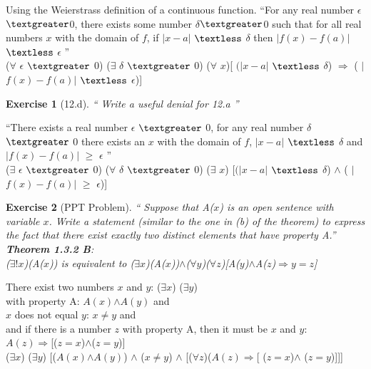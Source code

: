 \documentclass[11pt]{article}
\theoremstyle{quest}
\newtheorem*{exercise}{Exercise}
\begin{document}
\noindent Using the Weierstrass definition of a continuous function. ``For any real number 
$\epsilon$$\textgreater$0, there exists some number $\delta$$\textgreater$0 such that for all real numbers 
$x$ with the domain of $f$, if $|$$x-a$$|$ $\textless$ $\delta$ then $|$$f(x)-f(a)$$|$ $\textless$ $\epsilon$ ''\\

($\forall$ $\epsilon$ $\textgreater$ 0) ($\exists$ $\delta$ $\textgreater$ 0) ($\forall$ $x$)[ $(|$$x-a$$|$ $\textless$ $\delta$) $\Rightarrow$ ( $|$$f(x)-f(a)$$|$ $\textless$ $\epsilon$)]

\begin{exercise}[12.d]
  `` Write a useful denial for 12.a ''
\end{exercise}

\noindent ``There exists a real number $\epsilon$ $\textgreater$ 0, for any real number $\delta$ $\textgreater$ 0 there 
exists an $x$ with the domain of $f$, $|$$x-a$$|$ $\textless$ $\delta$ and $|$$f(x)-f(a)$$|$ $\ge$ $\epsilon$ ''\\

($\exists$ $\epsilon$ $\textgreater$ 0) ($\forall$ $\delta$ $\textgreater$ 0) ($\exists$ $x$) [$(|$$x-a$$|$ $\textless$ $\delta$) $\wedge$ ( $|$$f(x)-f(a)$$|$ $\ge$ $\epsilon$)]


\newpage

\begin{exercise}[PPT Problem]
  `` Suppose that A($x$) is an open sentence with variable $x$. Write a statement (similar to the one in (b) of the theorem) to express the fact that there exist exactly two distinct elements that have property 
  A.''\\
  \textbf{Theorem 1.3.2 B}:\\ ($\exists$$!$$x$)(A($x$)) is equivalent to 
  ($\exists$$x$)(A($x$))$\wedge$($\forall$$y$)($\forall$$z$)[A($y$)$\wedge$A($z$)$\Rightarrow$$y=z$]\\
\end{exercise}

\noindent There exist two numbers $x$ and $y$: ($\exists$$x$) ($\exists$$y$)\\
with property A: $A(x)$$\wedge$$A(y)$ and \\
$x$ does not equal $y$: $x$$\neq$$y$ and \\
and if there is a number $z$ with property A, then it must be $x$ and $y$:\\ 
$A(z)$$\Rightarrow$[($z=x$)$\wedge$($z=y$)]\\
($\exists$$x$) ($\exists$$y$) [($A(x)$$\wedge$$A(y)$) $\wedge$ ($x$$\neq$$y$) $\wedge$ [($\forall$$z$)($A(z)$$\Rightarrow$[ ($z=x$)$\wedge$ ($z=y$)]]]
\end{document}
